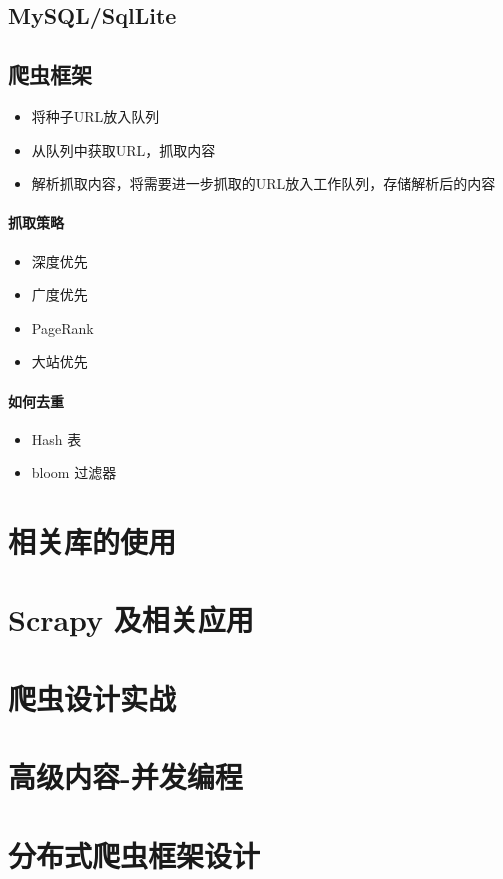 \documentclass[UTF8,a4paper,12pt]{ctexbook}
\begin{document}
			
		\subsection{MySQL/SqlLite}
		
		
		\subsection{爬虫框架}
			\begin{itemize}
				\item 将种子URL放入队列
				\item 从队列中获取URL，抓取内容
				\item 解析抓取内容，将需要进一步抓取的URL放入工作队列，存储解析后的内容
			\end{itemize}
			
			\paragraph{抓取策略}
				\begin{itemize}
					\item 深度优先
					\item 广度优先
					\item PageRank
					\item 大站优先
				\end{itemize}
			
			\paragraph{如何去重}
				\begin{itemize}
					\item Hash 表
					\item bloom 过滤器
				\end{itemize}	
		
	\section{相关库的使用}
	
	
	
	\section{Scrapy 及相关应用}
	
	
	\section{爬虫设计实战}
	
	
	
	\section{高级内容-并发编程}
	
	
	
	\section{分布式爬虫框架设计}
	
	
	
		
\end{document}

